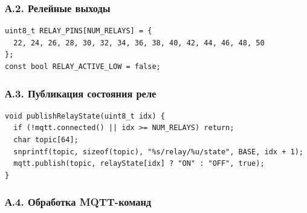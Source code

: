 \documentclass[a4paper,14pt]{extarticle}
\begin{document}
\hypertarget{ux430.2.-ux440ux435ux43bux435ux439ux43dux44bux435-ux432ux44bux445ux43eux434ux44b}{%
\subsubsection{А.2. Релейные
выходы}\label{ux430.2.-ux440ux435ux43bux435ux439ux43dux44bux435-ux432ux44bux445ux43eux434ux44b}}

\par\vspace{8pt}\noindent\begin{minipage}{\linewidth}
\setlength{\topsep}{3pt}\setlength{\partopsep}{0pt}
\begin{verbatim}
uint8_t RELAY_PINS[NUM_RELAYS] = {
  22, 24, 26, 28, 30, 32, 34, 36, 38, 40, 42, 44, 46, 48, 50
};
const bool RELAY_ACTIVE_LOW = false;
\end{verbatim}
\end{minipage}\par\vspace{8pt}

\hypertarget{ux430.3.-ux43fux443ux431ux43bux438ux43aux430ux446ux438ux44f-ux441ux43eux441ux442ux43eux44fux43dux438ux44f-ux440ux435ux43bux435}{%
\subsubsection{А.3. Публикация состояния
реле}\label{ux430.3.-ux43fux443ux431ux43bux438ux43aux430ux446ux438ux44f-ux441ux43eux441ux442ux43eux44fux43dux438ux44f-ux440ux435ux43bux435}}

\par\vspace{8pt}\noindent\begin{minipage}{\linewidth}
\setlength{\topsep}{3pt}\setlength{\partopsep}{0pt}
\begin{verbatim}
void publishRelayState(uint8_t idx) {
  if (!mqtt.connected() || idx >= NUM_RELAYS) return;
  char topic[64];
  snprintf(topic, sizeof(topic), "%s/relay/%u/state", BASE, idx + 1);
  mqtt.publish(topic, relayState[idx] ? "ON" : "OFF", true);
}
\end{verbatim}
\end{minipage}\par\vspace{8pt}

\hypertarget{ux430.4.-ux43eux431ux440ux430ux431ux43eux442ux43aux430-mqtt-ux43aux43eux43cux430ux43dux434}{%
\subsubsection{А.4. Обработка
MQTT-команд}\label{ux430.4.-ux43eux431ux440ux430ux431ux43eux442ux43aux430-mqtt-ux43aux43eux43cux430ux43dux434}}
\end{document}
